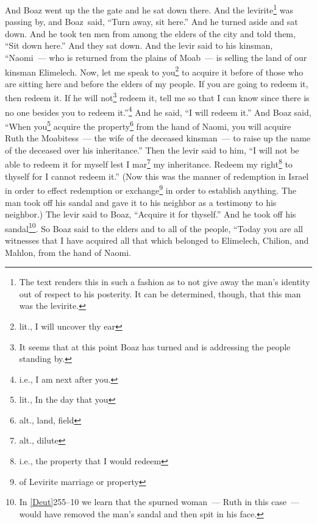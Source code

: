 
\begin{inparaenum}
     And Boaz went up the the gate and he sat down there. And the levirite\footnote{The text renders this in such a fashion as to not give away the man's identity out of respect to his posterity. It can be determined, though, that this man was the levirite.} was passing by, and Boaz\understood\ said, ``Turn away, sit here.'' And he turned aside and sat down.%
     And he took ten men from among the elders of the city and told them, ``Sit down here.'' And they sat down.%
     And the levir said to his kinsman, ``Naomi~--- who is returned from the plains of Moab~--- is selling the land of our kinsman Elimelech.%
     Now, let me speak to you\footnote{lit., I will uncover thy ear} to acquire it before of those who are sitting here and before the elders of my people. If you are going to redeem it, then redeem it. If he will not\footnote{It seems that at this point Boaz has turned and is addressing the people standing by.} redeem it, tell me so that I can know since there is no one besides you to redeem it.''\footnote{i.e., I am next after you.} And he said, ``I will redeem it.''%
     And Boaz said, ``When you\footnote{lit., In the day that you} acquire the property\footnote{alt., land, field} from the hand of Naomi, you will acquire Ruth the Moabitess~--- the wife of the deceased kinsman~--- to raise up the name of the deceased over his inheritance.''%
     Then the levir said to him, ``I will not be able to redeem it for myself lest I mar\footnote{alt., dilute} my inheritance. Redeem my right\footnote{i.e., the property that I would redeem} to thyself for I cannot redeem it.''%
     (Now this was the manner of redemption in Israel in order to effect redemption or exchange\footnote{of Levirite marriage or property} in order to establish anything. The man took off his sandal and gave it to his neighbor as a testimony to his neighbor.)%
     The levir said to Boaz, ``Acquire it for thyself.'' And he took off his sandal\footnote{In \vref{Deut}{25}{5--10} we learn that the spurned woman~--- Ruth in this case~--- would have removed the man's sandal and then spit in his face.}.%
     So Boaz said to the elders and to all of the people, ``Today you are all witnesses that I have acquired all that which belonged to Elimelech, Chilion, and Mahlon, from the hand of Naomi.%

\end{inparaenum}
